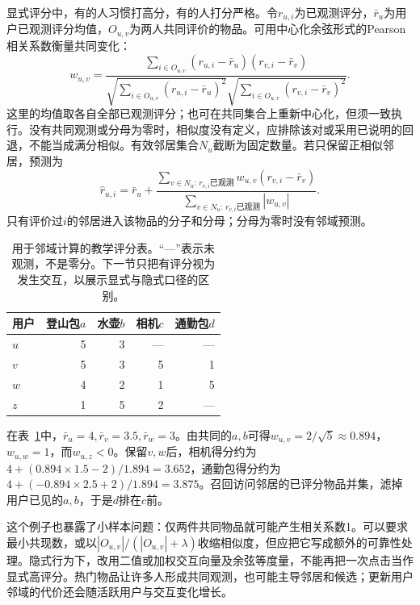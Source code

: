 显式评分中，有的人习惯打高分，有的人打分严格。令$r_{u,i}$为已观测评分，$\bar r_u$为用户已观测评分均值，$O_{u,v}$为两人共同评价的物品。可用中心化余弦形式的Pearson相关系数衡量共同变化：
\begin{equation}
 w_{u,v}=
 \frac{\sum_{i\in O_{u,v}}(r_{u,i}-\bar r_u)(r_{v,i}-\bar r_v)}
 {\sqrt{\sum_{i\in O_{u,v}}(r_{u,i}-\bar r_u)^2}
  \sqrt{\sum_{i\in O_{u,v}}(r_{v,i}-\bar r_v)^2}}.
 \label{eq:rs-usercf-sim}
\end{equation}
这里的均值取各自全部已观测评分；也可在共同集合上重新中心化，但须一致执行。没有共同观测或分母为零时，相似度没有定义，应排除该对或采用已说明的回退，不能当成满分相似。有效邻居集合$N_u$截断为固定数量。若只保留正相似邻居，预测为
\begin{equation}
 \widehat r_{u,i}=\bar r_u+
 \frac{\sum_{v\in N_u:\,r_{v,i}\text{已观测}}w_{u,v}(r_{v,i}-\bar r_v)}
 {\sum_{v\in N_u:\,r_{v,i}\text{已观测}}|w_{u,v}|}.
 \label{eq:rs-usercf-predict}
\end{equation}
只有评价过$i$的邻居进入该物品的分子和分母；分母为零时没有邻域预测。

\begin{table}[htbp]
 \centering\small
 \begin{tabular}{@{}lrrrr@{}}
 \toprule
 用户 & 登山包$a$ & 水壶$b$ & 相机$c$ & 通勤包$d$\\
 \midrule
 $u$ & 5&3&---&---\\
 $v$ & 5&3&5&1\\
 $w$ & 4&2&1&5\\
 $z$ & 1&5&2&---\\
 \bottomrule
 \end{tabular}
 \caption{用于邻域计算的教学评分表。“---”表示未观测，不是零分。下一节只把有评分视为发生交互，以展示显式与隐式口径的区别。}
 \label{tab:rs-cf-example}
\end{table}

在表~\ref{tab:rs-cf-example}中，$\bar r_u=4,\bar r_v=3.5,\bar r_w=3$。由共同的$a,b$可得$w_{u,v}=2/\sqrt5\approx0.894$，$w_{u,w}=1$，而$w_{u,z}<0$。保留$v,w$后，相机得分约为$4+(0.894\times1.5-2)/1.894=3.652$，通勤包得分约为$4+(-0.894\times2.5+2)/1.894=3.875$。召回访问邻居的已评分物品并集，滤掉用户已见的$a,b$，于是$d$排在$c$前。

这个例子也暴露了小样本问题：仅两件共同物品就可能产生相关系数1。可以要求最小共现数，或以$|O_{u,v}|/(|O_{u,v}|+\lambda)$收缩相似度，但应把它写成额外的可靠性处理。隐式行为下，改用二值或加权交互向量及余弦等度量，不能再把一次点击当作显式高评分。热门物品让许多人形成共同观测，也可能主导邻居和候选；更新用户邻域的代价还会随活跃用户与交互变化增长。

